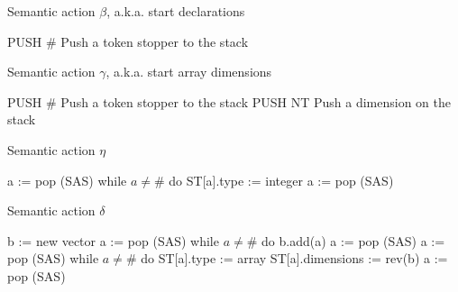 \documentclass[11pt]{article}
\begin{document}
\begin {algorithm}
\caption{ Semantic action $\beta$, a.k.a. start declarations }
\label{alg:B0}
\begin{algorithmic}
\STATE \textrm { PUSH \# }  Push a token stopper to the stack
\end{algorithmic}
\end{algorithm}

\begin {algorithm}
\caption{ Semantic action $\gamma$, a.k.a. start array dimensions }
\label{alg:B0}
\begin{algorithmic}
\STATE \textrm { PUSH \# }  Push a token stopper to the stack
\STATE \textrm { PUSH NT }  Push a dimension on the stack
\end{algorithmic}
\end{algorithm}

\begin {algorithm}
\caption{ Semantic action $\eta$}
\label{alg:W2}
\begin{algorithmic}
\STATE \textrm {a := pop (SAS) }
\STATE \textrm {while $a \neq \# $ do }
\STATE \hspace {0.5 cm} \textrm { ST[a].type := integer  }
\STATE \hspace {0.5 cm} \textrm { a := pop (SAS) }
\end{algorithmic}
\end{algorithm}


\begin {algorithm}
\caption{ Semantic action $\delta$}
\label{alg:W2}
\begin{algorithmic}
\STATE \textrm {b := new vector }
\STATE \textrm {a := pop (SAS) }
\STATE \textrm {while $a \neq \# $ do }
\STATE \hspace {0.5 cm} \textrm { b.add(a)  }
\STATE \hspace {0.5 cm} \textrm { a := pop (SAS) }
\STATE \textrm {a := pop (SAS) }
\STATE \textrm {while $a \neq \# $ do }
\STATE \hspace {0.5 cm} \textrm { ST[a].type := array  }
\STATE \hspace {0.5 cm} \textrm { ST[a].dimensions := rev(b) }
\STATE \hspace {0.5 cm} \textrm { a := pop (SAS) }
\end{algorithmic}
\end{algorithm}
\end{document}

